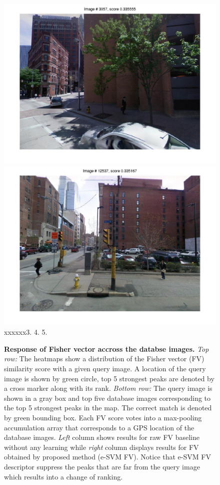 \documentclass[10pt,onecolumn,A4]{article}
\begin{document}
\begin{figure}
\begin{minipage}{0.45\linewidth}
		\colorbox{myCopper4}{\includegraphics[trim = 55mm 40mm 55mm 30mm, clip=true,width=0.30\linewidth]{sup1383/svm04.jpg}}
		\colorbox{myCopper5}{\includegraphics[trim = 55mm 40mm 55mm 30mm, clip=true,width=0.30\linewidth]{sup1383/svm05.jpg}}  \\
		\textcolor{myWhite}{xxxxxx}3. \hspace{0.25\linewidth}4. \hspace{0.25\linewidth}5. \\
	\end{minipage}
	\caption{ \textbf{Response of Fisher vector accross the databse images.}
		\emph{Top row:} The heatmaps show a distribution of the Fisher vector (FV) similarity score with a given query image. A location of the query image is shown by green circle, top 5 strongest peaks are denoted by a cross marker along with its rank. \emph{Bottom row:} The query image is shown in a gray box and top five database images corresponding to the top 5 strongest peaks in the map. The correct match is denoted by green bounding box.
		Each FV score votes into a max-pooling accumulation array that corresponds to a GPS location of the database images.
		\emph{Left} column shows results for raw FV baseline without any learning while \emph{right} column displays results for FV obtained by proposed method (e-SVM FV). Notice that e-SVM FV descriptor suppress the peaks that are far from the query image which results into a change of ranking.
		}
\end{figure}
\end{document}
